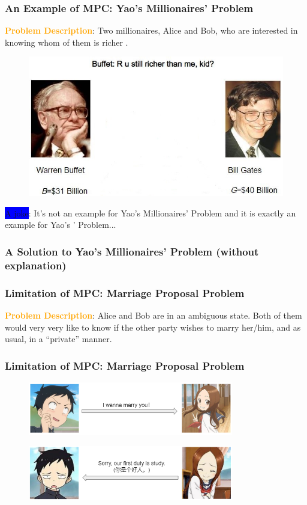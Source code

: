 \documentclass{beamer}
\begin{document}
\begin{frame}\frametitle{An Example of MPC: Yao's Millionaires' Problem} 
\textcolor{orange}{\textbf{Problem Description}}: Two millionaires, Alice and Bob, who are interested in knowing whom of them is richer .
\begin{figure}
	\includegraphics[width=3.1 in, height=1.9 in]{myfigs/SMC.jpg}
\end{figure}
\pause
\colorbox{blue}{A joke}: It's not an example for Yao's Millionaires' Problem and it is exactly an example for Yao's ' Problem...

\end{frame}


\begin{frame}\frametitle{A Solution to Yao's Millionaires' Problem (without explanation)} 

\end{frame}


\begin{frame}\frametitle{Limitation of MPC: Marriage Proposal Problem} 
\textcolor{orange}{\textbf{Problem Description}}: Alice and Bob are in an ambiguous state. Both of them would very very like to know if the other party wishes to marry her/him, and as usual, in a ``private'' manner.
\end{frame}


\begin{frame}\frametitle{Limitation of MPC: Marriage Proposal Problem} 
\begin{figure}
	\includegraphics[width=0.8\textwidth, height=0.3\textheight]{myfigs/gaomu1.jpg}
\end{figure}
\pause
\begin{figure}
	\includegraphics[width=0.8\textwidth, height=0.3\textheight]{myfigs/gaomu2.jpg}
\end{figure}
\end{frame}
\end{document}
